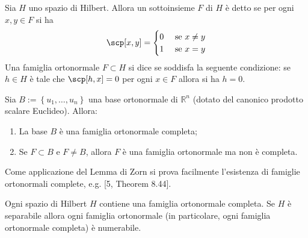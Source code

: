 \begin{boxdef}
    Sia $H$ uno spazio di Hilbert. Allora un sottoinsieme $F$ di $H$ è detto  se per ogni $x, y \in F$ si ha
    \[
    \scp[x, y]= \begin{cases}0 & \text { se } x \neq y \\ 1 & \text { se } x=y\end{cases}
    \]
    Una famiglia ortonormale $F \subset H$ si dice  se soddisfa la seguente condizione: se $h \in H$ è tale che $\scp[h, x]=0$ per ogni $x \in F$ allora si ha $h=0$.
\end{boxdef}

\begin{oss}
    
    Sia $B:=\left\{u_{1}, \ldots, u_{n}\right\}$ una base ortonormale di $\mathbb{R}^{n}$ (dotato del canonico prodotto scalare Euclideo). Allora:
    \begin{enumerate}
        \item La base $B$ è una famiglia ortonormale completa;
        \item Se $F \subset B$ e $F \neq B$, allora $F$ è una famiglia ortonormale ma non è completa.
    \end{enumerate}
\end{oss}

Come applicazione del Lemma di Zorn si prova facilmente l'esistenza di famiglie ortonormali complete, e.g. [5, Theorem 8.44].

\begin{shadedTheorem}
    Ogni spazio di Hilbert $H$ contiene una famiglia ortonormale completa. Se $H$ è separabile allora ogni famiglia ortonormale (in particolare, ogni famiglia ortonormale completa) è numerabile.
\end{shadedTheorem}

